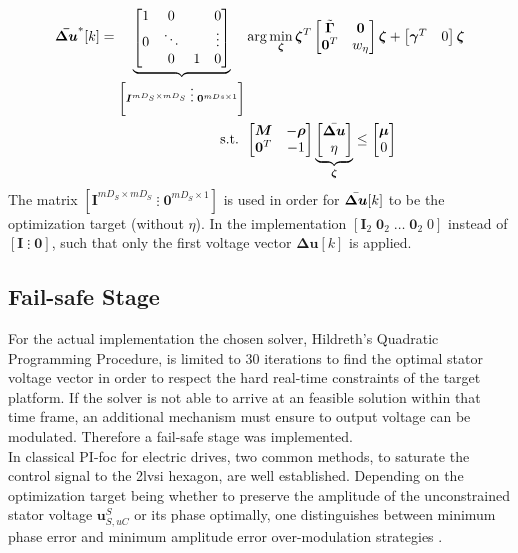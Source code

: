 \begin{equation}
	\begin{split}
		\boldsymbol{\Bar{\Delta u}}^* [k] = 
		\underbrace{
		\scriptstyle{\begin{bmatrix} 
				1 & 0 & & 0\\
				0& \ddots & &  \vdots\\
				& 0& 1 & 0
		\end{bmatrix}}}_{\left[\bm{I}^{mD_S \times mD_S}\;\vdots\;\bm{0}^{ mDs \times 1} \right]} 
		&\arg \min_{\boldsymbol{\zeta}}
		\bm{\zeta}^T \begin{bmatrix}
			\Tilde{\bm{\Gamma}} & \bm{0} \\
			\bm{0}^T & w_{\eta}
		\end{bmatrix} \bm{\zeta} +
		\begin{bmatrix}
			{\bm{\gamma}}^T & 0
		\end{bmatrix} \bm{\zeta}
		\\
		\text{s.t. }& \begin{bmatrix}
			\bm{M} & -\bm{\rho} \\
			\bm{0}^T & -1
		\end{bmatrix} 
		\underbrace{\begin{bmatrix}
				\Bar{\bm{\Delta u}}\\ \eta
		\end{bmatrix}}_{\bm{\zeta}}
		\leq \begin{bmatrix}
			{\bm{\mu}} \\ 0
		\end{bmatrix}
	\end{split}
	\label{equ:2_QP_sc}
\end{equation}
The matrix $\left[\bm{I}^{mD_S \times mD_S}\;\vdots\;\bm{0}^{mD_S\times 1} \right]$ is used in order for $\Bar{\bm{\Delta u}}[k]$ to be the optimization target (without $\eta$). In the implementation $[\bm{I}_2\; \bm{0}_2 \; \hdots\; \bm{0}_2 \; 0 ]$ instead of $\left[\bm{I}\;\vdots\;\bm{0} \right]$, such that only the first voltage vector $\bm{\Delta u}[k]$ is applied.


\subsection{Fail-safe Stage} \label{sec:mpcc_ext_fs}
For the actual implementation the chosen solver, Hildreth's Quadratic Programming Procedure, is limited to 30 iterations to find the optimal stator voltage vector in order to respect the hard real-time constraints of the target platform. If the solver is not able to arrive at an feasible solution within that time frame, an additional mechanism must ensure to output voltage can be modulated. Therefore a fail-safe stage was implemented.\\
In classical PI-\acrshort{foc} for electric drives, two common methods, to saturate the control signal to the \acrshort{2lvsi} hexagon, are well established.  Depending on the optimization target being whether to preserve the amplitude of the unconstrained stator voltage $\bm{u}_{S,uC}^S$ or its phase optimally, one distinguishes between minimum phase error  and minimum amplitude error over-modulation strategies \cite{OmFwIm}.

